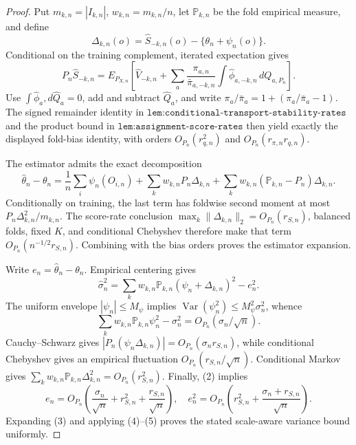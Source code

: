 \documentclass{article}
\begin{document}
\begin{proof}
Put \(m_{k,n}=|I_{k,n}|\), \(w_{k,n}=m_{k,n}/n\), let \(\mathbb P_{k,n}\) be the fold empirical measure, and define
\[\Delta_{k,n}(o)=\widehat S_{-k,n}(o)-\{\theta_n+\psi_n(o)\}.\]
Conditional on the training complement, iterated expectation gives
\[P_n\widehat S_{-k,n}=E_{P_{X,n}}\!\left[\widehat V_{-k,n}+\sum_a\frac{\pi_{a,n}}{\bar\pi_{a,-k,n}}\int\widehat\phi_{a,-k,n}\,dQ_{a,P_n}\right].\tag{1}\]
Use \(\int\widehat\phi_a,d\widehat Q_a=0\), add and subtract \(\widehat Q_a\), and write \(\pi_a/\bar\pi_a=1+(\pi_a/\bar\pi_a-1)\). The signed remainder identity in \(\texttt{lem:conditional-transport-stability-rates}\) and the product bound in \(\texttt{lem:assignment-score-rates}\) then yield exactly the displayed fold-bias identity, with orders \(O_{P_n}(r_{q,n}^2)\) and \(O_{P_n}(r_{\pi,n}r_{q,n})\).

The estimator admits the exact decomposition
\[\widehat\theta_n-\theta_n=\frac1n\sum_i\psi_n(O_{i,n})+\sum_kw_{k,n}P_n\Delta_{k,n}+\sum_kw_{k,n}(\mathbb P_{k,n}-P_n)\Delta_{k,n}.\tag{2}\]
Conditionally on training, the last term has foldwise second moment at most \(P_n\Delta_{k,n}^2/m_{k,n}\). The score-rate conclusion \(\max_k\lVert\Delta_{k,n}\rVert_2=O_{P_n}(r_{S,n})\), balanced folds, fixed \(K\), and conditional Chebyshev therefore make that term \(O_{P_n}(n^{-1/2}r_{S,n})\). Combining with the bias orders proves the estimator expansion.

Write \(e_n=\widehat\theta_n-\theta_n\). Empirical centering gives
\[\widehat\sigma_n^2=\sum_kw_{k,n}\mathbb P_{k,n}(\psi_n+\Delta_{k,n})^2-e_n^2.\tag{3}\]
The uniform envelope \(|\psi_n|\le M_\psi\) implies \(\operatorname{Var}(\psi_n^2)\le M_\psi^2\sigma_n^2\), whence
\[\sum_kw_{k,n}\mathbb P_{k,n}\psi_n^2-\sigma_n^2=O_{P_n}(\sigma_n/\sqrt n).\tag{4}\]
Cauchy--Schwarz gives \(|P_n(\psi_n\Delta_{k,n})|=O_{P_n}(\sigma_nr_{S,n})\), while conditional Chebyshev gives an empirical fluctuation \(O_{P_n}(r_{S,n}/\sqrt n)\). Conditional Markov gives \(\sum_kw_{k,n}\mathbb P_{k,n}\Delta_{k,n}^2=O_{P_n}(r_{S,n}^2)\). Finally, (2) implies
\[e_n=O_{P_n}\!\left(\frac{\sigma_n}{\sqrt n}+r_{S,n}^2+\frac{r_{S,n}}{\sqrt n}\right),\quad e_n^2=O_{P_n}\!\left(r_{S,n}^2+\frac{\sigma_n+r_{S,n}}{\sqrt n}\right).\tag{5}\]
Expanding (3) and applying (4)--(5) proves the stated scale-aware variance bound uniformly.
\end{proof}
\end{document}
